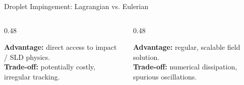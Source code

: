 \begin{frame}{Droplet Impingement: Lagrangian vs. Eulerian}
\vfill
\begin{columns}[T,onlytextwidth]
\begin{column}{0.48\textwidth}
\colorbox{champsBlue!7}{%
\parbox{0.94\linewidth}{\vspace{0.09cm}\centering\scriptsize
\textbf{Advantage:} direct access to impact / SLD physics.\\[1pt]
\textbf{Trade-off:} potentially costly, irregular tracking.
\vspace{0.09cm}}}
\end{column}
\begin{column}{0.48\textwidth}
\colorbox{champsBlue!7}{%
\parbox{0.94\linewidth}{\vspace{0.09cm}\centering\scriptsize
\textbf{Advantage:} regular, scalable field solution.\\[1pt]
\textbf{Trade-off:} numerical dissipation, spurious oscillations.
\vspace{0.09cm}}}
\end{column}
\end{columns}
\end{frame}

\providecommand{\LDIhead}[1]{{\color{champsBlue}\bfseries #1}}
\providecommand{\LDIbottom}[1]{%
  \begin{center}%
  \begin{tikzpicture}
  \node[fill=champsBlue!5, draw=champsBlue!18, rounded corners=4pt,
        text width=0.90\textwidth, inner sep=3pt, align=center, font=\small] {#1};
  \end{tikzpicture}%
  \end{center}}

